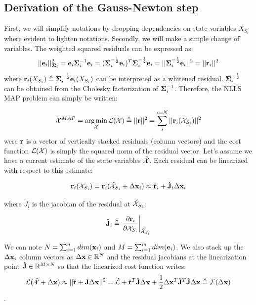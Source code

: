 \subsection{Derivation of the Gauss-Newton step}
First, we will simplify notations by dropping dependencies on state variables $X_{S_i}$ where evident to lighten notations. 
Secondly, we will make a simple change of variables. The weighted squared residuals can be expressed as:
\begin{equation}
    ||{\bf e}_i||^2_{{\bm \Sigma}_i} = {\bf e}_i {\bm \Sigma}_i^{-1} {\bf e}_i 
    = ({\bm \Sigma}_i^{-\frac{1}{2}}{\bf e}_i)^T{\bm \Sigma}_i^{-\frac{1}{2}}{\bf e}_i
    = ||{\bm \Sigma}_i^{-\frac{1}{2}}{\bf e}_i||^2 = ||{\bf r}_i||^2
\end{equation}
where ${\bf r}_i(X_{S_i}) \triangleq {\bm \Sigma}_i^{-\frac{1}{2}}{\bf e}_i(X_{S_i})$ can be interpreted as a whitened residual. ${\bm \Sigma}_i^{-\frac{1}{2}}$ can be obtained
from the Cholesky factorization of ${\bm \Sigma}_i^{-1}$. Therefore, the NLLS MAP problem can simply be written:

\begin{equation}
    \mathcal{X}^{MAP} = \operatorname*{arg\,min}_{\mathcal{X}} \mathcal{L}(\mathcal{X}) \triangleq||{\bf r}||^2 = \sum_i^{i=N} ||{\bf r}_i({\mathcal{X}_{S_i}})||^2 
\end{equation}
were ${\bf r}$ is a vector of vertically stacked residuals (column vectors) and the cost function $\mathcal{L}(\mathcal{X})$ is simply the squared norm 
of the residual vector. Let's assume we have a current estimate of the state variables $\check{\mathcal{X}}$.
Each residual can be linearized with respect to this estimate:

\begin{equation}
    {\bf r}_i(\mathcal{X}_{S_i}) = {\bf r}_i(\check{\mathcal{X}}_{S_i} + \Delta {\bf x}_i) \approx \check{{\bf r}}_i + \check{{\bf J}}_i \Delta {\bf x}_i
\end{equation}

where $\check{J}_i$ is the jacobian of the residual at $\check{\mathcal{X}}_{S_i}$: 

\begin{equation}
    \check{{\bf J}}_i \triangleq \left.\frac{\partial {\bf r}_i}{\partial \mathcal{X}_{S_i}}\right|_{\check{\mathcal{X}}_{S_i}}
    \label{eq:res_jacobian}
\end{equation}

We can note $N = \sum_{i=1}^{n}dim({\bf x}_i)$ and $M = \sum_{i=1}^{m}dim({\bf e}_i)$.
We also stack up the $\Delta {\bf x}_i$ column vectors as $\Delta {\bf x} \in \mathbb{R}^N$ and the residual jacobians at the linearization point 
$\check{{\bf J}} \in \mathbb{R}^{M \times N}$ so that the linearized cost function writes:  
%
\begin{equation}
    \mathcal{L}(\check{\mathcal{X}} + \Delta {\bf x}) 
    \approx ||\check{{\bf r}} + {\bf J} \Delta {\bf x}||^2 
    = \check{\mathcal{L}} +  \check{{\bf r}}^T \check{{\bf J}} \Delta {\bf x} + \frac{1}{2}\Delta {\bf x}^T \check{{\bf J}}^T \check{{\bf J}} \Delta {\bf x} 
    \triangleq \mathcal{F}(\Delta {\bf x})
\end{equation}.

